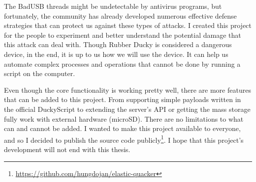 The BadUSB threads might be undetectable by antivirus programs, but fortunately, the community has already developed numerous effective defense strategies that can protect us against these types of attacks. I created this project for the people to experiment and better understand the potential damage that this attack can deal with. Though Rubber Ducky is considered a dangerous device, in the end, it is up to us how we will use the device. It can help us automate complex processes and operations that cannot be done by running a script on the computer.

Even though the core functionality is working pretty well, there are more features that can be added to this project. From supporting simple payloads written in the official DuckyScript to extending the server's API or getting the mass storage fully work with external hardware (microSD). There are no limitations to what can and cannot be added. I wanted to make this project available to everyone, and so I decided to publish the source code publicly\footnote{\url{https://github.com/hungdojan/elastic-quacker}}. I hope that this project's development will not end with this thesis.

